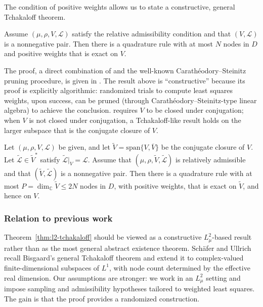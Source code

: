 \documentclass[10pt,dvipsnames]{amsart}
\begin{document}
The condition of positive weights allows us to state a constructive, general Tchakaloff theorem.
\begin{theorem}\label{thm:l2-tchakaloff}
  Assume $(\mu, \rho, V, \mathcal{L})$ satisfy the relative admissibility condition and that $(V,\mathcal{L})$ is a nonnegative pair. Then there is a quadrature rule with at most $N$ nodes in $D$ and positive weights that is exact on $V$.
\end{theorem}
The proof, a direct combination of  and
the well-known Carath\'eodory--Steinitz pruning procedure, is given in
. The result above is ``constructive'' because its proof
is explicitly algorithmic: randomized trials to compute least squares weights,
upon success, can be pruned (through Carath\'eodory--Steinitz-type linear algebra)
to achieve the conclusion.  requires $V$ to be closed under conjugation; when $V$ is not closed under conjugation, a Tchakaloff-like result holds on the larger subspace that is the conjugate closure of $V$.
\begin{theorem}\label{thm:l2-tchakaloff-conjugate}
  Let $(\mu, \rho, V, \mathcal{L})$ be given, and let
  \(\widetilde V = \mathrm{span}\{V, \overline{V}\}\) be the conjugate closure
  of \(V\). Let \(\widetilde{\mathcal L}\in\widetilde V^*\) satisfy
  \(\widetilde{\mathcal L}|_V=\mathcal L\). Assume that
  \((\mu,\rho,\widetilde V,\widetilde{\mathcal L})\) is relatively admissible
  and that \((\widetilde V,\widetilde{\mathcal L})\) is a nonnegative pair.
  Then there is a quadrature rule with at most
  \(P=\dim_{\mathbb C}\widetilde V\leq2N\) nodes in \(D\), with positive
  weights, that is exact on \(\widetilde V\), and hence on \(V\).
\end{theorem}

\subsubsection{Relation to previous work}

Theorem~\ref{thm:l2-tchakaloff} should be viewed as a constructive
\(L^2_\mu\)-based result rather than as the most general abstract existence
theorem.  Schäfer and Ullrich~\cite{schafer_2025} recall Bisgaard's general
Tchakaloff theorem and extend it to complex-valued finite-dimensional
subspaces of \(L^1\), with node count determined by the effective real
dimension.  Our assumptions are stronger: we work in an \(L^2_\mu\) setting
and impose sampling and admissibility hypotheses tailored to weighted least
squares.  The gain is that the proof provides a randomized construction.
\end{document}
